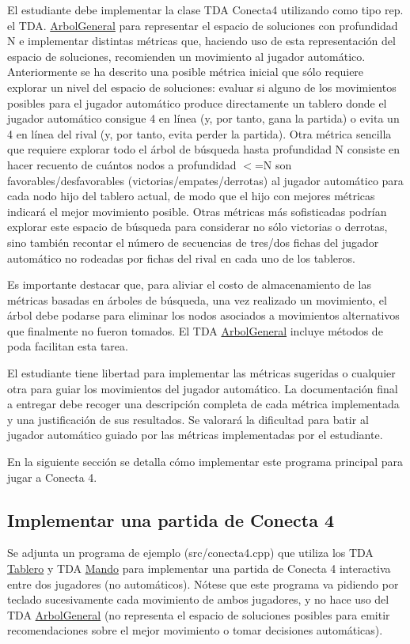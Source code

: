 El estudiante debe implementar la clase T\-D\-A Conecta4 utilizando como tipo rep. el T\-D\-A. \hyperlink{classArbolGeneral}{Arbol\-General} para representar el espacio de soluciones con profundidad N e implementar distintas métricas que, haciendo uso de esta representación del espacio de soluciones, recomienden un movimiento al jugador automático. Anteriormente se ha descrito una posible métrica inicial que sólo requiere explorar un nivel del espacio de soluciones\-: evaluar si alguno de los movimientos posibles para el jugador automático produce directamente un tablero donde el jugador automático consigue 4 en línea (y, por tanto, gana la partida) o evita un 4 en línea del rival (y, por tanto, evita perder la partida). Otra métrica sencilla que requiere explorar todo el árbol de búsqueda hasta profundidad N consiste en hacer recuento de cuántos nodos a profundidad $<$=N son favorables/desfavorables (victorias/empates/derrotas) al jugador automático para cada nodo hijo del tablero actual, de modo que el hijo con mejores métricas indicará el mejor movimiento posible. Otras métricas más sofisticadas podrían explorar este espacio de búsqueda para considerar no sólo victorias o derrotas, sino también recontar el número de secuencias de tres/dos fichas del jugador automático no rodeadas por fichas del rival en cada uno de los tableros.

Es importante destacar que, para aliviar el costo de almacenamiento de las métricas basadas en árboles de búsqueda, una vez realizado un movimiento, el árbol debe podarse para eliminar los nodos asociados a movimientos alternativos que finalmente no fueron tomados. El T\-D\-A \hyperlink{classArbolGeneral}{Arbol\-General} incluye métodos de poda facilitan esta tarea.

El estudiante tiene libertad para implementar las métricas sugeridas o cualquier otra para guiar los movimientos del jugador automático. La documentación final a entregar debe recoger una descripción completa de cada métrica implementada y una justificación de sus resultados. Se valorará la dificultad para batir al jugador automático guiado por las métricas implementadas por el estudiante.

En la siguiente sección se detalla cómo implementar este programa principal para jugar a Conecta 4.\hypertarget{index_partida}{}\subsection{Implementar una partida de Conecta 4}\label{index_partida}
Se adjunta un programa de ejemplo ({\ttfamily src/conecta4.\-cpp}) que utiliza los T\-D\-A \hyperlink{classTablero}{Tablero} y T\-D\-A \hyperlink{classMando}{Mando} para implementar una partida de Conecta 4 interactiva entre dos jugadores (no automáticos). Nótese que este programa va pidiendo por teclado sucesivamente cada movimiento de ambos jugadores, y no hace uso del T\-D\-A \hyperlink{classArbolGeneral}{Arbol\-General} (no representa el espacio de soluciones posibles para emitir recomendaciones sobre el mejor movimiento o tomar decisiones automáticas).


